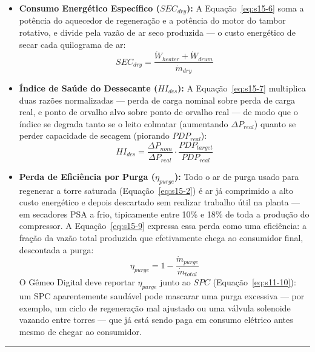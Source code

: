 \documentclass[12pt,a4paper]{article}
\numberwithin{equation}{section}
\numberwithin{table}{section}
\numberwithin{figure}{section}
\begin{document}
		\begin{itemize}
			\item \textbf{Consumo Energético Específico ($SEC_{dry}$):} A Equação~\eqref{eq:s15-6} soma a potência do aquecedor de regeneração e a potência do motor do tambor rotativo, e divide pela vazão de ar seco produzida — o custo energético de secar cada quilograma de ar:
			\begin{equation}\label{eq:s15-6}
SEC_{dry} = \frac{\dot{W}_{heater} + \dot{W}_{drum}}{\dot{m}_{dry}}
\end{equation}

			\item \textbf{Índice de Saúde do Dessecante ($HI_{des}$):} A Equação~\eqref{eq:s15-7} multiplica duas razões normalizadas — perda de carga nominal sobre perda de carga real, e ponto de orvalho alvo sobre ponto de orvalho real — de modo que o índice se degrada tanto se o leito colmatar (aumentando $\Delta P_{real}$) quanto se perder capacidade de secagem (piorando $PDP_{real}$):
			\begin{equation}\label{eq:s15-7}
HI_{des} = \frac{\Delta P_{nom}}{\Delta P_{real}} \cdot \frac{PDP_{target}}{PDP_{real}}
\end{equation}

			\item \textbf{Perda de Eficiência por Purga ($\eta_{purge}$):} Todo o ar de purga usado para regenerar a torre saturada (Equação~\eqref{eq:s15-2}) é ar já comprimido a alto custo energético e depois descartado sem realizar trabalho útil na planta — em secadores PSA a frio, tipicamente entre 10\% e 18\% de toda a produção do compressor. A Equação~\eqref{eq:s15-9} expressa essa perda como uma eficiência: a fração da vazão total produzida que efetivamente chega ao consumidor final, descontada a purga:
			\begin{equation}\label{eq:s15-9}
\eta_{purge} = 1 - \frac{\dot{m}_{purge}}{\dot{m}_{total}}
\end{equation}
			O Gêmeo Digital deve reportar $\eta_{purge}$ junto ao $SPC$ (Equação~\eqref{eq:s11-10}): um SPC aparentemente saudável pode mascarar uma purga excessiva — por exemplo, um ciclo de regeneração mal ajustado ou uma válvula solenoide vazando entre torres — que já está sendo paga em consumo elétrico antes mesmo de chegar ao consumidor.
		\end{itemize}
		
		\vspace{1em}
		\hrule
		\vspace{1em}
		
\end{document}

